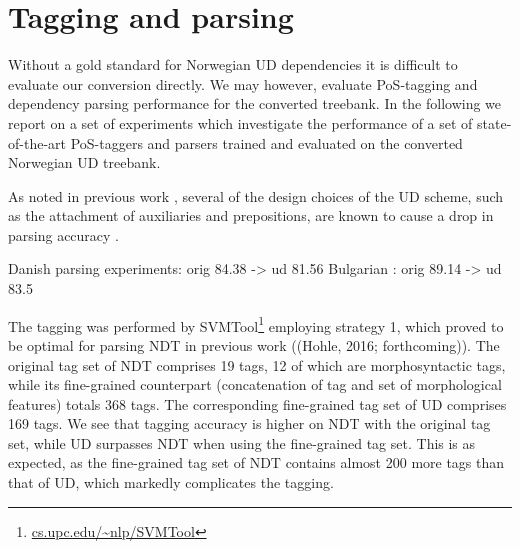 \documentclass[10pt, a4paper]{article}
\begin{document}



\section{Tagging and parsing}
Without a gold standard for Norwegian UD dependencies it is difficult
to evaluate our conversion directly. We may however, evaluate
PoS-tagging and dependency parsing performance for the converted
treebank.  In the following we report on a set of experiments which
investigate the performance of a set of state-of-the-art PoS-taggers
and parsers trained and evaluated on the converted Norwegian UD
treebank.

As noted in previous work \cite{Mar:Doz:Sil:14}, several of the design
choices of the UD scheme, such as the attachment of auxiliaries and
prepositions, are known to cause a drop in parsing accuracy
\cite{Sch:Abe:Rap:12}.

Danish parsing experiments: \cite{Joh:Alo:Pla:15} orig 84.38 -> ud 81.56
Bulgarian \cite{Ose:Sim:15}: orig 89.14 -> ud 83.5

The tagging was performed by SVMTool\footnote{\url{cs.upc.edu/~nlp/SVMTool}}
employing strategy 1, which proved to be optimal for parsing NDT in previous
work ((Hohle, 2016; forthcoming)). The original tag set of NDT comprises 19
tags, 12 of which are morphosyntactic tags, while its fine-grained counterpart
(concatenation of tag and set of morphological features) totals 368 tags. The
corresponding fine-grained tag set of UD comprises 169 tags. We see that
tagging accuracy is higher on NDT with the original tag set, while UD surpasses
NDT when using the fine-grained tag set. This is as expected, as the
fine-grained tag set of NDT contains almost 200 more tags than that of UD,
which markedly complicates the tagging.
\end{document}
